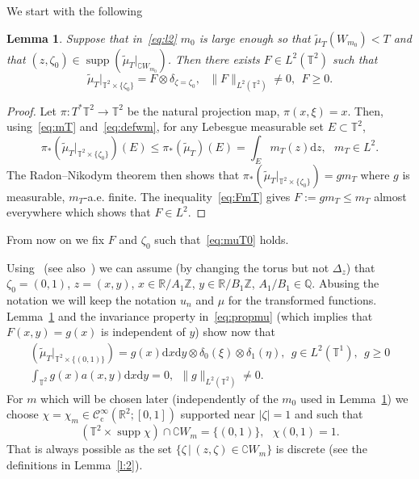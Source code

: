 \documentclass[10pt]{amsart}
\newtheorem{lemm}[theo]{Lemma}\newtheorem{prop}[theo]{Proposition}\newtheorem{coro}[theo]{Corollary}\newtheorem{conj}[theo]{Conjecture}
\theoremstyle{definition}\newtheorem{defi}[theo]{Definition}\newtheorem{rema}[theo]{Remark}\newtheorem{exam}[theo]{Example}\newtheorem{exem}[theo]{Example}\newtheorem{nota}[theo]{Notation}
\DeclareMathOperator{\supp}{supp}
\newcommand{\CIc}{{\mathcal C}^\infty_{\mathrm{c}} }
\newcommand{\R}{{\mathbb R}}
\newcommand{\TT}{{\mathbb T}}
\newcommand{\ZZ}{{\mathbb Z}}
\newcommand*{\dd}{\mathrm{d}}
\newcommand*{\dx}{\dd x}
\newcommand*{\dy}{\dd y}
\newcommand*{\dz}{\dd z}
\newcommand*{\tq}{\,|\,}
\begin{document}
We start with the following

\begin{lemm}\label{l:RN}
Suppose that in~\eqref{eq:l2} $ m_0 $ is large enough so that $ \widetilde \mu_T (W_{m_0}) < T $ and that $ (z, \zeta_0) \in \supp (\widetilde \mu_T |_{ \complement W_{m_0} }) $. Then there exists $ F \in L^2 (\TT^2) $ such that
\begin{equation}\label{eq:muT0}
\widetilde \mu_T |_{ \TT^2 \times \{ \zeta_0 \} } = F \otimes \delta_{ \zeta = \zeta_0 }, \ \ \ \| F \|_{ L^2 (\TT^2) } \neq 0, \ \ F \geq 0.
\end{equation}
\end{lemm}

\begin{proof}
Let $ \pi : T^*\TT^2 \to \TT^2 $ be the natural projection map, $ \pi (x, \xi) = x $. Then, using~\eqref{eq:mT} and~\eqref{eq:defwm}, for any Lebesgue measurable set $ E \subset \TT^2 $,
\begin{equation}\label{eq:FmT}
\pi_* (\widetilde \mu_T |_{ \TT^2 \times \{ \zeta_0 \}}) (E)
\leq \pi_* (\widetilde \mu_T) (E) = \int_E m_T (z) \dz, \ \ \ m_T \in L^2.
\end{equation}
The Radon--Nikodym theorem then shows that $ \pi_* (\widetilde \mu_T |_{ \TT^2 \times \{ \zeta_0 \}}) = g m_T $ where $ g $ is measurable, $m_T$-a.e. finite. The inequality~\eqref{eq:FmT} gives $ F := g m_T \leq m_T $ almost everywhere which shows that $ F \in L^2 $.
\end{proof}

From now on we fix $ F $ and $ \zeta_0 $ such that~\eqref{eq:muT0} holds.

Using~\cite[Lemma~2.7]{BZ4} (see also~\cite[Figure~1]{BZ4}) we can assume (by changing the torus but not $ \Delta_z $) that $ \zeta_0 = (0, 1) $, $ z = (x, y) $, $ x \in \R/A_1 \ZZ $, $ y \in \R /B_1 \ZZ $, $ A_1/B_1 \in
\mathbb Q $. Abusing the notation we will keep the notation $ u_n $ and $
\mu $ for the transformed functions. Lemma~\ref{l:RN} and the invariance property in~\eqref{eq:propmu} (which implies that $ F (x, y) = g (x) $ is independent of $ y $) show now that
\begin{equation}\label{eq:muT00}
\begin{gathered}
(\widetilde \mu_T |_{ \TT^2 \times \{ (0,1) \} }) = g (x) \dx\dy \otimes \delta_{0} (\xi) \otimes\delta_1 (\eta), \ \ g \in L^2 (\TT^1), \ \ g \geq 0 \\
\int_{ \TT^2 } g (x) a (x, y) \dx \dy = 0, \ \
\| g \|_{ L^2 (\TT^2)} \neq 0.
\end{gathered}
\end{equation}
For $ m $ which will be chosen later (independently of the $ m_0 $ used in Lemma~\ref{l:RN}) we choose $ \chi = \chi_m \in \CIc (\R^2; [0,1])$ supported near $ | \zeta |= 1 $ and such that
\begin{equation}\label{eq:suppchi}
(\TT^2 \times \supp \chi) \cap \complement W_m = \{ (0, 1) \}, \ \ \ \chi(0,1) = 1.
\end{equation}
That is always possible as the set $ \{\zeta \tq (z, \zeta) \in \complement W_m \} $ is discrete (see the definitions in Lemma~\ref{l:2}).
\end{document}
